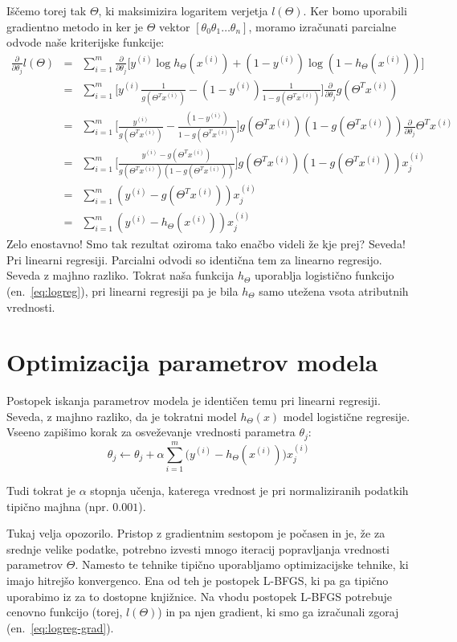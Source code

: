 Iščemo torej tak $\Theta$, ki maksimizira logaritem verjetja $l(\Theta)$. Ker bomo uporabili gradientno metodo in ker je $\Theta$ vektor $[\theta_0 \theta_1 \ldots \theta_n]$, moramo izračunati parcialne odvode naše kriterijske funkcije:
\begin{eqnarray}
  \frac{\partial}{\partial\theta_j}l(\Theta)
  & = & \sum_{i=1}^m \frac{\partial}{\partial\theta_j} \big[y^{(i)}\log h_\Theta(x^{(i)})+(1-y^{(i)})\log (1-h_\Theta(x^{(i)})) \big] \nonumber \\
  & = & \sum_{i=1}^m \big[y^{(i)}\frac{1}{g(\Theta^T x^{(i)})}-(1-y^{(i)})\frac{1}{1-g(\Theta^T x^{(i)})} \big]\frac{\partial}{\partial\theta_j}g(\Theta^T x^{(i)}) \nonumber\\
  & = & \sum_{i=1}^m \big[\frac{y^{(i)}}{g(\Theta^T x^{(i)})}-\frac{(1-y^{(i)})}{1-g(\Theta^T x^{(i)})} \big]g(\Theta^T x^{(i)})(1-g(\Theta^T x^{(i)}))
  \frac{\partial}{\partial\theta_j}\Theta^T x^{(i)}\nonumber\\
  & = & \sum_{i=1}^m \big[\frac{y^{(i)} - g(\Theta^T x^{(i)})} {g(\Theta^T x^{(i)})(1-g(\Theta^T x^{(i)}))} \big]g(\Theta^T x^{(i)})(1-g(\Theta^T x^{(i)})) x_j^{(i)}\nonumber\\
  & = & \sum_{i=1}^m (y^{(i)}-g(\Theta^T x^{(i)}))x_j^{(i)}\nonumber\\
  & = & \sum_{i=1}^m (y^{(i)}-h_\Theta(x^{(i)}))x_j^{(i)}\nonumber
  \label{eq:logreg-grad}
\end{eqnarray}
Zelo enostavno! Smo tak rezultat oziroma tako enačbo videli že kje prej? Seveda! Pri linearni regresiji. Parcialni odvodi so identična tem za linearno regresijo. Seveda z majhno razliko. Tokrat naša funkcija $h_\Theta$ uporablja logistično funkcijo (en.~\ref{eq:logreg}), pri linearni regresiji pa je bila $h_\Theta$ samo utežena vsota atributnih vrednosti.

\section{Optimizacija parametrov modela}

Postopek iskanja parametrov modela je identičen temu pri linearni regresiji. Seveda, z majhno razliko, da je tokratni model $h_\Theta(x)$ model logistične regresije. Vseeno zapišimo korak za osveževanje vrednosti parametra $\theta_j$:
\begin{equation}
  \theta_j\leftarrow\theta_j+\alpha\sum_{i=1}^{m}\big(y^{(i)}-h_\Theta(x^{(i)})\big) x_j^{(i)}
\end{equation}

Tudi tokrat je $\alpha$ stopnja učenja, katerega vrednost je pri normaliziranih podatkih tipično majhna (npr. $0.001$).

Tukaj velja opozorilo. Pristop z gradientnim sestopom je počasen in je, že za srednje velike podatke, potrebno izvesti mnogo iteracij popravljanja vrednosti parametrov $\Theta$. Namesto te tehnike tipično uporabljamo optimizacijske tehnike, ki imajo hitrejšo konvergenco. Ena od teh je postopek L-BFGS, ki pa ga tipično uporabimo iz za to dostopne knjižnice. Na vhodu postopek L-BFGS potrebuje cenovno funkcijo (torej, $l(\Theta)$) in pa njen gradient, ki smo ga izračunali zgoraj (en.~\ref{eq:logreg-grad}).
